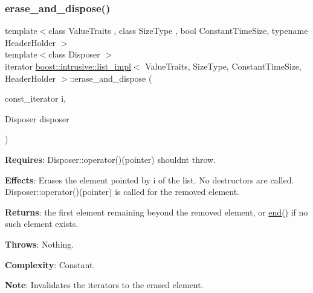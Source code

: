 \subsubsection{\texorpdfstring{erase\+\_\+and\+\_\+dispose()}{erase\_and\_dispose()}\hspace{0.1cm}{\footnotesize\ttfamily [1/2]}}
{\footnotesize\ttfamily template$<$class Value\+Traits , class Size\+Type , bool Constant\+Time\+Size, typename Header\+Holder $>$ \\
template$<$class Disposer $>$ \\
iterator \hyperlink{classboost_1_1intrusive_1_1list__impl}{boost\+::intrusive\+::list\+\_\+impl}$<$ Value\+Traits, Size\+Type, Constant\+Time\+Size, Header\+Holder $>$\+::erase\+\_\+and\+\_\+dispose (\begin{DoxyParamCaption}\item[{const\+\_\+iterator}]{i,  }\item[{Disposer}]{disposer }\end{DoxyParamCaption})\hspace{0.3cm}{\ttfamily [inline]}}

{\bfseries Requires}\+: Disposer\+::operator()(pointer) shouldn\textquotesingle{}t throw.

{\bfseries Effects}\+: Erases the element pointed by i of the list. No destructors are called. Disposer\+::operator()(pointer) is called for the removed element.

{\bfseries Returns}\+: the first element remaining beyond the removed element, or \hyperlink{classboost_1_1intrusive_1_1list__impl_af2a454471fced6d4b2fb899c50bbee67}{end()} if no such element exists.

{\bfseries Throws}\+: Nothing.

{\bfseries Complexity}\+: Constant.

{\bfseries Note}\+: Invalidates the iterators to the erased element. \mbox{\label{classboost_1_1intrusive_1_1list__impl_a9c68fe0a61da85e83ebe11bc02283bef}} 
